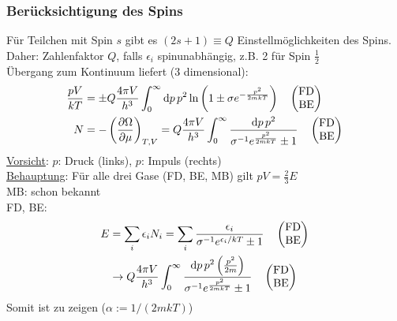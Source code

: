 \subsubsection{Berücksichtigung des Spins}
Für Teilchen mit Spin $s$ gibt es $(2s+1) \equiv Q$ Einstellmöglichkeiten des Spins. \\
Daher: Zahlenfaktor $Q$, falls $\epsilon_i$ spinunabhängig, z.B. 2 für Spin $\frac{1}{2}$ \\
Übergang zum Kontinuum liefert (3 dimensional):
\begin{equation}
    \begin{split}
\frac{p V}{k T} &= \pm Q \frac{4 \pi V}{h^3} \int_0^\infty \mathrm{d} p\, p^2 \ln \left( 1 \pm \sigma e^{- \frac{p^2}{2 m k T}} \right) \quad \begin{pmatrix} \text{FD} \\ \text{BE} \end{pmatrix} \\
N &= - \left( \frac{\partial \Omega}{\partial \mu} \right)_{T, V} = Q \frac{4 \pi V}{h^3} \int_0^\infty \frac{\mathrm{d} p \, p^2}{\sigma^{-1} e^{\frac{p^2}{2 m k T}} \pm 1} \quad \begin{pmatrix} \text{FD} \\ \text{BE} \end{pmatrix}
    \end{split}
\end{equation}
\underline{Vorsicht}: $p$: Druck (links), $p$: Impuls (rechts) \\
\underline{Behauptung}: Für alle drei Gase (FD, BE, MB) gilt $p V = \frac{2}{3} E$\\
MB: schon bekannt \\ %
FD, BE:
\begin{equation}
    \begin{split}
E &= \sum_i \epsilon_i N_i = \sum_i \frac{\epsilon_i}{\sigma^{-1} e^{\epsilon_i / k T} \pm 1} \quad \begin{pmatrix} \text{FD} \\ \text{BE} \end{pmatrix} \\
&\rightarrow Q \frac{4 \pi V}{h^3} \int_0^\infty \frac{\mathrm{d} p \, p^2 \left( \frac{p^2}{2 m} \right) }{\sigma^{-1} e^{\frac{p^2}{2 m k T}} \pm 1} \quad \begin{pmatrix} \text{FD} \\ \text{BE} \end{pmatrix}
    \end{split}
\end{equation}
Somit ist zu zeigen ($\alpha := 1/(2 m k T)$)
